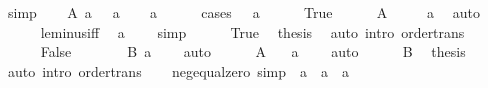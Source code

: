 \begin{isabellebody}
\ simp\isanewline
{}\isamarkupfalse%
\isanewline
\ \ \isamarkupfalse%
\ A{\isacharcolon}{\kern0pt}\ {\isachardoublequoteopen}a\ {\isacharequal}{\kern0pt}\ {\isacharminus}{\kern0pt}\ a{\isachardoublequoteclose}\isanewline
\ \ \isamarkupfalse%
\ {\isachardoublequoteopen}a\ {\isacharequal}{\kern0pt}\ {}{\isachardoublequoteclose}\isanewline
\ \ \isamarkupfalse%
\ {\isacharparenleft}{\kern0pt}cases\ {\isachardoublequoteopen}{}\ {\isasymle}\ a{\isachardoublequoteclose}{\isacharparenright}{\kern0pt}\isanewline
\ \ \ \ \isamarkupfalse%
\ True\isanewline
\ \ \ \ \isamarkupfalse%
\ A\ \isamarkupfalse%
\ {\isachardoublequoteopen}{}\ {\isasymle}\ {\isacharminus}{\kern0pt}\ a{\isachardoublequoteclose}\ \isamarkupfalse%
\ auto\isanewline
\ \ \ \ \isamarkupfalse%
\ le{\isacharunderscore}{\kern0pt}minus{\isacharunderscore}{\kern0pt}iff\ \isamarkupfalse%
\ {\isachardoublequoteopen}a\ {\isasymle}\ {}{\isachardoublequoteclose}\ \isamarkupfalse%
\ simp\isanewline
\ \ \ \ \isamarkupfalse%
\ True\ \isamarkupfalse%
\ {\isacharquery}{\kern0pt}thesis\ \isamarkupfalse%
\ {\isacharparenleft}{\kern0pt}auto\ intro{\isacharcolon}{\kern0pt}\ order{\isacharunderscore}{\kern0pt}trans{\isacharparenright}{\kern0pt}\isanewline
\ \ \isamarkupfalse%
\isanewline
\ \ \ \ \isamarkupfalse%
\ False\isanewline
\ \ \ \ \isamarkupfalse%
\ \isamarkupfalse%
\ B{\isacharcolon}{\kern0pt}\ {\isachardoublequoteopen}a\ {\isasymle}\ {}{\isachardoublequoteclose}\ \isamarkupfalse%
\ auto\isanewline
\ \ \ \ \isamarkupfalse%
\ A\ \isamarkupfalse%
\ {\isachardoublequoteopen}{\isacharminus}{\kern0pt}\ a\ {\isasymle}\ {}{\isachardoublequoteclose}\ \isamarkupfalse%
\ auto\isanewline
\ \ \ \ \isamarkupfalse%
\ B\ \isamarkupfalse%
\ {\isacharquery}{\kern0pt}thesis\ \isamarkupfalse%
\ {\isacharparenleft}{\kern0pt}auto\ intro{\isacharcolon}{\kern0pt}\ order{\isacharunderscore}{\kern0pt}trans{\isacharparenright}{\kern0pt}\isanewline
\ \ \isamarkupfalse%
\isanewline
{}\isamarkupfalse%
%
\endisatagproof
{\isafoldproof}%
%
\isadelimproof
\isanewline
%
\endisadelimproof
\isanewline
{}\isamarkupfalse%
\ neg{\isacharunderscore}{\kern0pt}equal{\isacharunderscore}{\kern0pt}zero\ {\isacharbrackleft}{\kern0pt}simp{\isacharbrackright}{\kern0pt}{\isacharcolon}{\kern0pt}\ {\isachardoublequoteopen}{\isacharminus}{\kern0pt}\ a\ {\isacharequal}{\kern0pt}\ a\ {\isasymlongleftrightarrow}\ a\ {\isacharequal}{\kern0pt}\ {}{\isachardoublequoteclose}\isanewline

\end{isabellebody}
